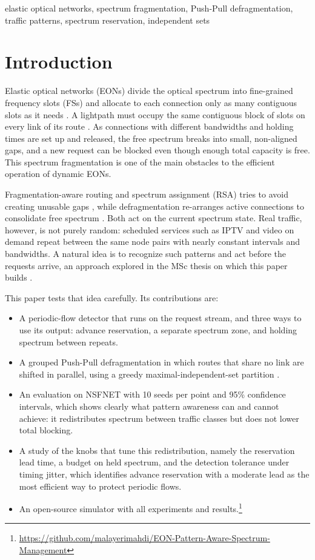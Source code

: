 \documentclass[conference]{IEEEtran}
\begin{document}
\begin{IEEEkeywords}
elastic optical networks, spectrum fragmentation, Push-Pull defragmentation, traffic patterns, spectrum reservation, independent sets
\end{IEEEkeywords}

\section{Introduction}
Elastic optical networks (EONs) divide the optical spectrum into fine-grained frequency slots (FSs) and allocate to each connection only as many contiguous slots as it needs \cite{jinno2009,gerstel2012}. A lightpath must occupy the same contiguous block of slots on every link of its route \cite{chatterjee2015}. As connections with different bandwidths and holding times are set up and released, the free spectrum breaks into small, non-aligned gaps, and a new request can be blocked even though enough total capacity is free. This spectrum fragmentation is one of the main obstacles to the efficient operation of dynamic EONs.

Fragmentation-aware routing and spectrum assignment (RSA) tries to avoid creating unusable gaps \cite{shen2015,abkenar2017}, while defragmentation re-arranges active connections to consolidate free spectrum \cite{patel2011,wang2013,zhang2013,cugini2013}. Both act on the current spectrum state. Real traffic, however, is not purely random: scheduled services such as IPTV and video on demand repeat between the same node pairs with nearly constant intervals and bandwidths. A natural idea is to recognize such patterns and act before the requests arrive, an approach explored in the MSc thesis on which this paper builds \cite{malayeri2022}.

This paper tests that idea carefully. Its contributions are:
\begin{itemize}
\item A periodic-flow detector that runs on the request stream, and three ways to use its output: advance reservation, a separate spectrum zone, and holding spectrum between repeats.
\item A grouped Push-Pull defragmentation in which routes that share no link are shifted in parallel, using a greedy maximal-independent-set partition \cite{shakya2013}.
\item An evaluation on NSFNET with 10 seeds per point and 95\% confidence intervals, which shows clearly what pattern awareness can and cannot achieve: it redistributes spectrum between traffic classes but does not lower total blocking.
\item A study of the knobs that tune this redistribution, namely the reservation lead time, a budget on held spectrum, and the detection tolerance under timing jitter, which identifies advance reservation with a moderate lead as the most efficient way to protect periodic flows.
\item An open-source simulator with all experiments and results.\footnote{\url{https://github.com/malayerimahdi/EON-Pattern-Aware-Spectrum-Management}}
\end{itemize}
\end{document}
